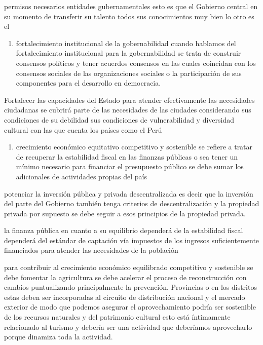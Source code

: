 \documentclass[
  jou,
  floatsintext,
  longtable,
  a4paper,
  nolmodern,
  notxfonts,
  notimes,
  12pt,
  colorlinks=true,linkcolor=blue,citecolor=blue,urlcolor=blue]{apa7}
\providecommand{\tightlist}{%
  \setlength{\itemsep}{0pt}\setlength{\parskip}{0pt}}
\begin{document}
permisos necesarios entidades gubernamentales esto es que el Gobierno
central en su momento de transferir su talento todos sus conocimientos
muy bien lo otro es el

\begin{enumerate}
\def\labelenumi{\arabic{enumi}.}
\setcounter{enumi}{1}
\tightlist
\item
  fortalecimiento institucional de la gobernabilidad cuando hablamos del
  fortalecimiento institucional para la gobernabilidad se trata de
  construir consensos políticos y tener acuerdos consensos en las cuales
  coincidan con los consensos sociales de las organizaciones sociales o
  la participación de sus componentes para el desarrollo en democracia.
\end{enumerate}

Fortalecer las capacidades del Estado para atender efectivamente las
necesidades ciudadanas se cubrirá parte de las necesidades de las
ciudades considerando sus condiciones de su debilidad sus condiciones de
vulnerabilidad y diversidad cultural con las que cuenta los países como
el Perú

\begin{enumerate}
\def\labelenumi{\arabic{enumi}.}
\setcounter{enumi}{2}
\tightlist
\item
  crecimiento económico equitativo competitivo y sostenible se refiere a
  tratar de recuperar la estabilidad fiscal en las finanzas públicas o
  sea tener un mínimo necesario para financiar el presupuesto público se
  debe sumar los adicionales de actividades propias del país
\end{enumerate}

potenciar la inversión pública y privada descentralizada es decir que la
inversión del parte del Gobierno también tenga criterios de
descentralización y la propiedad privada por supuesto se debe seguir a
esos principios de la propiedad privada.

la finanza pública en cuanto a su equilibrio dependerá de la estabilidad
fiscal dependerá del estándar de captación vía impuestos de los ingresos
suficientemente financiados para atender las necesidades de la población

para contribuir al crecimiento económico equilibrado competitivo y
sostenible se debe fomentar la agricultura se debe acelerar el proceso
de reconstrucción con cambios puntualizando principalmente la
prevención. Provincias o en los distritos estas deben ser incorporadas
al circuito de distribución nacional y el mercado exterior de modo que
podemos asegurar el aprovechamiento podría ser sostenible de los
recursos naturales y del patrimonio cultural esto está íntimamente
relacionado al turismo y debería ser una actividad que deberíamos
aprovecharlo porque dinamiza toda la actividad.
\end{document}
